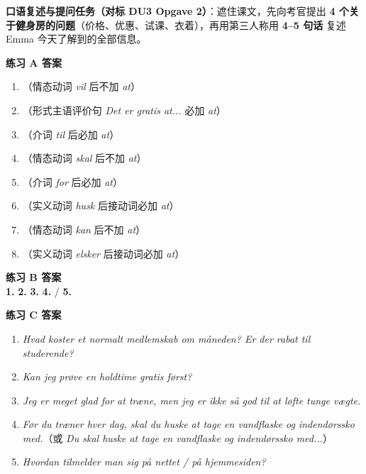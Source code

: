 
\textbf{口语复述与提问任务（对标 DU3 Opgave 2）}：遮住课文，先向考官提出 \textbf{4 个关于健身房的问题}（价格、优惠、试课、衣着），再用第三人称用 \textbf{4--5 句话} 复述 Emma 今天了解到的全部信息。

\begin{answerbox}
\textbf{练习 A 答案}
\begin{enumerate}
  \item \dabold{---}（情态动词 \textit{vil} 后不加 \textit{at}）
  \item {}（形式主语评价句 \textit{Det er gratis at...} 必加 \textit{at}）
  \item {}（介词 \textit{til} 后必加 \textit{at}）
  \item \dabold{---}（情态动词 \textit{skal} 后不加 \textit{at}）
  \item {}（介词 \textit{for} 后必加 \textit{at}）
  \item {}（实义动词 \textit{husk} 后接动词必加 \textit{at}）
  \item \dabold{---}（情态动词 \textit{kan} 后不加 \textit{at}）
  \item {}（实义动词 \textit{elsker} 后接动词必加 \textit{at}）
\end{enumerate}

\textbf{练习 B 答案}\\
\textbf{1.}  \quad \textbf{2.}  \quad \textbf{3.}  \quad \textbf{4.}  /  \quad \textbf{5.} 

\textbf{练习 C 答案}
\begin{enumerate}
  \item \textit{Hvad koster et normalt medlemskab om måneden? Er der rabat til studerende?}
  \item \textit{Kan jeg prøve en holdtime gratis først?}
  \item \textit{Jeg er meget glad for at træne, men jeg er ikke så god til at løfte tunge vægte.}
  \item \textit{Før du træner hver dag, skal du huske at tage en vandflaske og indendørssko med.}（或 \textit{Du skal huske at tage en vandflaske og indendørssko med...}）
  \item \textit{Hvordan tilmelder man sig på nettet / på hjemmesiden?}
\end{enumerate}


\end{answerbox}

